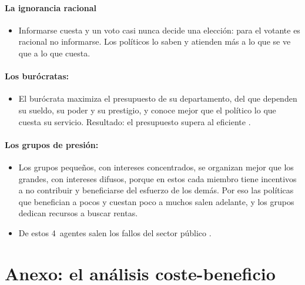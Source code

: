 \documentclass[11pt]{article}
\begin{document}
\paragraph{La ignorancia racional}

\begin{itemize}
\item Informarse cuesta y un voto casi nunca decide una elección: para el votante es racional no informarse\nocite{Downs1957Economic}. Los políticos lo saben y atienden más a lo que se ve que a lo que cuesta.
\end{itemize}

\paragraph{Los burócratas: }

\begin{itemize}
\item El burócrata maximiza el presupuesto de su departamento, del que dependen su sueldo, su poder y su prestigio, y conoce mejor que el político lo que cuesta su servicio. Resultado: el presupuesto supera al eficiente\nocite{Niskanen1971Bureaucracy} .
\end{itemize}

\paragraph{Los grupos de presión: }

\begin{itemize}
\item Los grupos pequeños, con intereses concentrados, se organizan mejor que los grandes, con intereses difusos, porque en estos cada miembro tiene incentivos a no contribuir y beneficiarse del esfuerzo de los demás\nocite{Olson1965Logic}. Por eso las políticas que benefician a pocos y cuestan poco a muchos salen adelante, y los grupos dedican recursos a buscar rentas.
\item De estos 4~agentes salen los fallos del sector público .
\end{itemize}

\section{Anexo: el análisis coste-beneficio}\label{anexo:acb}
\end{document}
